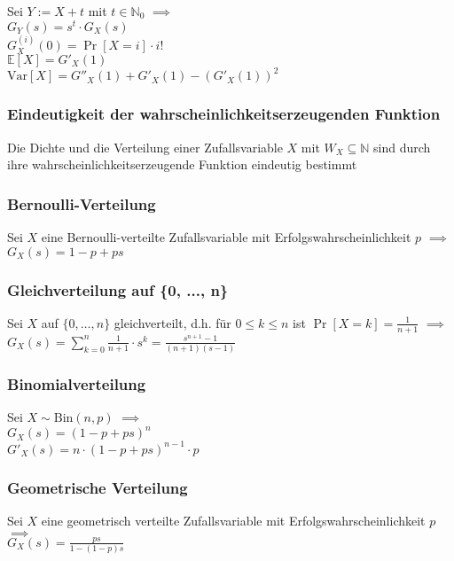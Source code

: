 \documentclass[a4paper,9pt]{extarticle}
\newcommand{\Var}{\text{Var}}
\begin{document}
Sei $Y := X + t$ mit $t \in \mathbb{N}_0$ $\implies$ \\
$G_Y(s) = s^t ⋅ G_X(s)$ \\

$G^{(i)}_X(0) = \Pr[X = i] ⋅ i!$ \\
$\mathbb{E}[X] = G'_X(1)$ \\
$\Var[X] = G''_X(1) + G'_X(1) - (G'_X(1))^2$

\subsubsection*{Eindeutigkeit der wahrscheinlichkeitserzeugenden Funktion}
Die Dichte und die Verteilung einer Zufallsvariable $X$ mit $W_X \subseteq \mathbb{N}$ sind durch ihre wahrscheinlichkeitserzeugende Funktion eindeutig bestimmt

\subsubsection*{Bernoulli-Verteilung}
Sei $X$ eine Bernoulli-verteilte Zufallsvariable mit Erfolgswahrscheinlichkeit $p$ $\implies$ \\
$G_X(s) = 1 - p + ps$

\subsubsection*{Gleichverteilung auf \{0, ..., n\}}
Sei $X$ auf $\{0, \dots, n\}$ gleichverteilt, d.h. für $0 ≤ k ≤ n$ ist $\Pr[X = k] = \frac{1}{n + 1}$ $\implies$ \\
$G_X(s) = \sum_{k=0}^n \frac{1}{n + 1} ⋅ s^k = \frac{s^{n + 1} - 1}{(n + 1)(s - 1)}$

\subsubsection*{Binomialverteilung}
Sei $X \sim \text{Bin}(n,p)$ $\implies$ \\
$G_X(s) = (1 - p + ps)^n$ \\

$G'_X(s) = n ⋅ (1 - p + ps)^{n - 1} ⋅ p$

\subsubsection*{Geometrische Verteilung}
Sei $X$ eine geometrisch verteilte Zufallsvariable mit Erfolgswahrscheinlichkeit $p$ $\implies$ \\
$G_X(s) = \frac{ps}{1 - (1 - p)s}$
\end{document}

